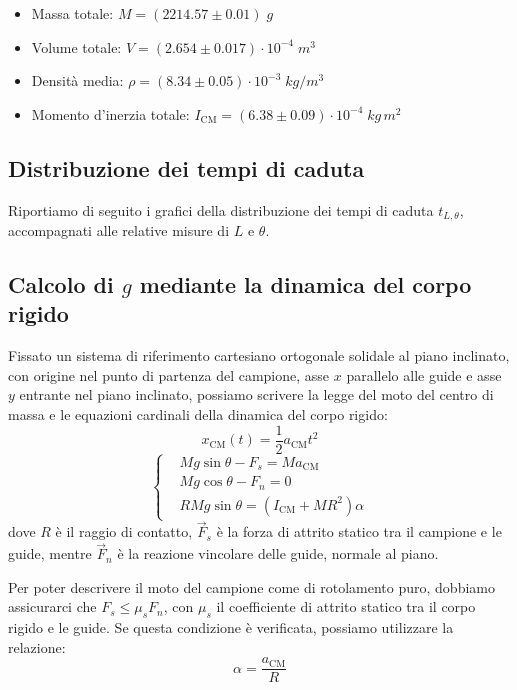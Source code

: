 \documentclass{article}
\begin{document}
\begin{itemize}
    \item Massa totale: $M=(2214.57\pm0.01)\;\unit{g}$
    \item Volume totale: $V=(2.654\pm0.017)\cdot10^{-4}\;\unit{m^3}$
    \item Densità media: $\rho=(8.34\pm0.05)\cdot10^{-3}\;\unit{kg \per m^3}$
    \item Momento d'inerzia totale: $I_\text{CM}=(6.38\pm0.09)\cdot10^{-4}\;\unit{kg\,m^2}$
\end{itemize}

\subsection{Distribuzione dei tempi di caduta}

Riportiamo di seguito i grafici della distribuzione dei tempi di caduta $t_{L,\theta}$,
accompagnati alle relative misure di $L$ e $\theta$.

\begin{center}
\end{center}

\subsection{Calcolo di $g$ mediante la dinamica del corpo rigido}

Fissato un sistema di riferimento cartesiano ortogonale solidale
al piano inclinato, con origine nel punto di partenza del campione,
asse $x$ parallelo alle guide e asse $y$ entrante nel piano inclinato,
possiamo scrivere la legge del moto del centro di massa e le
equazioni cardinali della dinamica del corpo rigido:
\[x_\text{CM}(t) = \frac{1}{2} a_\text{CM} t^2\]
\[\left\{\begin{aligned}
    &M g \sin\theta - F_s = M a_\text{CM} \\
    &M g \cos\theta - F_n = 0 \\
    &R M g \sin\theta = \left(I_\text{CM} + M R^2\right) \alpha
\end{aligned}\right.\]
dove $R$ è il raggio di contatto, $\vec{F}_s$ è la forza di attrito statico
tra il campione e le guide, mentre $\vec{F}_n$ è la reazione vincolare delle
guide, normale al piano.

Per poter descrivere il moto del campione come di rotolamento puro,
dobbiamo assicurarci che $F_s \le \mu_s F_n$, con $\mu_s$ il
coefficiente di attrito statico tra il corpo rigido e le guide.
Se questa condizione è verificata, possiamo utilizzare la relazione:
\[\alpha = \frac{a_\text{CM}}{R}\]
\end{document}
